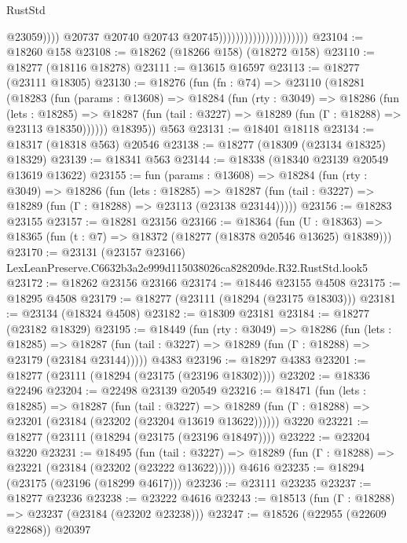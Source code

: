 \begin{lexlean}{RustStd}
\begin{coremodule}
                                                      @23059))))
                                              @20737
                                              @20740
                                              @20743
                                              @20745)))))))))))))))))))))
@23104 := @18260 @158
@23108 := @18262 (@18266 @158) (@18272 @158)
@23110 := @18277 (@18116 @18278)
@23111 := @13615 @16597
@23113 := @18277 (@23111 @18305)
@23130 := @18276
    (fun (fn : @74) =>
    @23110
      (@18281
        (@18283
          (fun (params : @13608) =>
          @18284
            (fun (rty : @3049) =>
            @18286
              (fun (lets : @18285) =>
              @18287 (fun (tail : @3227) => @18289 (fun (Γ : @18288) => @23113 @18350))))))
        @18395))
    @563
@23131 := @18401 @18118
@23134 := @18317 (@18318 @563) @20546
@23138 := @18277 (@18309 (@23134 @18325) @18329)
@23139 := @18341 @563
@23144 := @18338 (@18340 @23139 @20549 @13619 @13622)
@23155 := fun (params : @13608) =>
  @18284
    (fun (rty : @3049) =>
    @18286
      (fun (lets : @18285) =>
      @18287 (fun (tail : @3227) => @18289 (fun (Γ : @18288) => @23113 (@23138 @23144)))))
@23156 := @18283 @23155
@23157 := @18281 @23156
@23166 := @18364
    (fun (U : @18363) => @18365 (fun (t : @7) => @18372 (@18277 (@18378 @20546 @13625) @18389)))
@23170 := @23131 (@23157 @23166) LexLeanPreserve.C6632b3a2e999d115038026ca828209de.R32.RustStd.look5
@23172 := @18262 @23156 @23166
@23174 := @18446 @23155 @4508
@23175 := @18295 @4508
@23179 := @18277 (@23111 (@18294 (@23175 @18303)))
@23181 := @23134 (@18324 @4508)
@23182 := @18309 @23181
@23184 := @18277 (@23182 @18329)
@23195 := @18449
    (fun (rty : @3049) =>
    @18286
      (fun (lets : @18285) =>
      @18287 (fun (tail : @3227) => @18289 (fun (Γ : @18288) => @23179 (@23184 @23144)))))
    @4383
@23196 := @18297 @4383
@23201 := @18277 (@23111 (@18294 (@23175 (@23196 @18302))))
@23202 := @18336 @22496
@23204 := @22498 @23139 @20549
@23216 := @18471
    (fun (lets : @18285) =>
    @18287
      (fun (tail : @3227) =>
      @18289 (fun (Γ : @18288) => @23201 (@23184 (@23202 (@23204 @13619 @13622))))))
    @3220
@23221 := @18277 (@23111 (@18294 (@23175 (@23196 @18497))))
@23222 := @23204 @3220
@23231 := @18495
    (fun (tail : @3227) => @18289 (fun (Γ : @18288) => @23221 (@23184 (@23202 (@23222 @13622)))))
    @4616
@23235 := @18294 (@23175 (@23196 (@18299 @4617)))
@23236 := @23111 @23235
@23237 := @18277 @23236
@23238 := @23222 @4616
@23243 := @18513 (fun (Γ : @18288) => @23237 (@23184 (@23202 @23238)))
@23247 := @18526 (@22955 (@22609 @22868)) @20397

\end{coremodule}
\end{lexlean}
